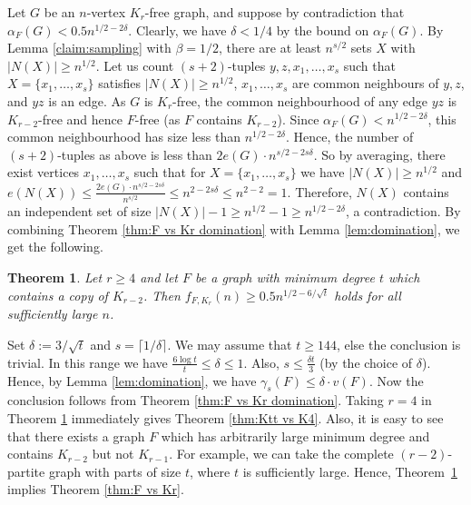 \documentclass[11pt]{article}
\let\oldendproof\endproof
\renewenvironment{proof}[1][\proofname]{\oldproof[\bf #1]}{\oldendproof}
\theoremstyle{plain}
\newtheorem{theorem}{Theorem}[section]
\theoremstyle{definition}
\begin{document}
\begin{proof}
Let $G$ be an $n$-vertex $K_r$-free graph, and suppose by contradiction that $\alpha_F(G) < 0.5n^{1/2 - 2\delta}$. Clearly, we have $\delta<1/4$ by the bound on $\alpha_F(G)$. By Lemma \ref{claim:sampling} with $\beta = 1/2$, there are at least $n^{s/2}$ sets $X$ with $|N(X)| \geq n^{1/2}$. Let us count $(s+2)$-tuples $y,z,x_1,\dots,x_s$ such that $X = \{x_1,\dots,x_s\}$ satisfies $|N(X)| \geq n^{1/2}$, $x_1,\dots,x_s$ are common neighbours of $y,z$, and $yz$ is an edge. 
As $G$ is $K_r$-free, the common neighbourhood of any edge $yz$ is $K_{r-2}$-free and hence $F$-free (as $F$ contains $K_{r-2}$).
Since $\alpha_F(G) < n^{1/2-2\delta}$, this common neighbourhood has size less than $n^{1/2-2\delta}$. Hence, the number of $(s+2)$-tuples as above is less than $2e(G) \cdot n^{s/2-2s\delta}$. 
So by averaging, there exist vertices $x_1,\dots,x_s$ such that for $X = \{x_1,\dots,x_s\}$ we have $|N(X)|\geq n^{1/2}$ and
$e(N(X)) \leq \frac{2e(G) \cdot n^{s/2 - 2s\delta}}{n^{s/2}} \leq n^{2-2s\delta} \leq n^{2 - 2} = 1$. Therefore, $N(X)$ contains an independent set of size $|N(X)| - 1 \geq n^{1/2}-1 \geq n^{1/2-2\delta}$, a contradiction.  
\end{proof}
By combining Theorem \ref{thm:F vs Kr domination} with Lemma \ref{lem:domination}, we get the following. 
\begin{theorem}\label{thm:F vs Kr main}
    Let $r \geq 4$ and let $F$ be a graph with minimum degree $t$ which contains a copy of $K_{r-2}$. Then $f_{F,K_r}(n) \geq 0.5n^{1/2 - 6/\sqrt{t}}$ holds for all sufficiently large $n$.
\end{theorem}
\begin{proof}
    Set $\delta := 3/\sqrt{t}$ and $s = \lceil 1/\delta \rceil$. We may assume that $t \geq 144$, else the conclusion is trivial. In this range we have $\frac{6\log t}{t} \leq \delta \leq 1$. Also, $s \leq \frac{\delta t}{3}$ (by the choice of $\delta$). Hence, by Lemma \ref{lem:domination}, we have $\gamma_s(F) \leq \delta \cdot v(F)$. Now the conclusion follows from Theorem \ref{thm:F vs Kr domination}. 
\end{proof}
Taking $r=4$ in Theorem \ref{thm:F vs Kr main} immediately gives Theorem \ref{thm:Ktt vs K4}. Also, it is easy to see that there exists a graph $F$ which has arbitrarily large minimum degree and contains $K_{r-2}$ but not $K_{r-1}$. For example, we can take the complete $(r-2)$-partite graph with parts of size $t$, where $t$ is sufficiently large. Hence, Theorem~\ref{thm:F vs Kr main} implies Theorem \ref{thm:F vs Kr}.
\end{document}
